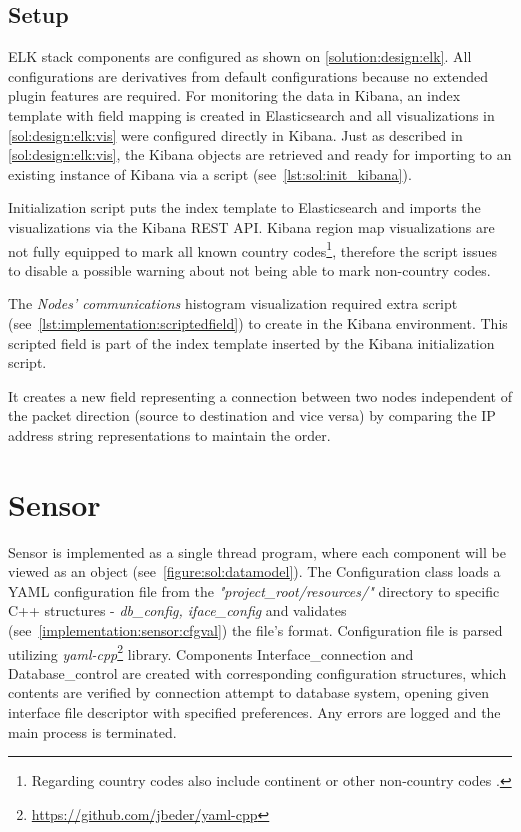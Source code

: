 \documentclass[12pt,a4paper,twoside]{book}
\begin{document}
        \subsection{Setup} \label{implementation:elk:setup}
            ELK stack components are configured as shown on \autoref{solution:design:elk}. All configurations are derivatives from default configurations because no extended plugin features are required. For monitoring the data in Kibana, an index template with field mapping is created in Elasticsearch and all visualizations in \autoref{sol:design:elk:vis} were configured directly in Kibana. Just as described in \autoref{sol:design:elk:vis}, the Kibana objects are retrieved and ready for importing to an existing instance of Kibana via a script (see~\autoref{lst:sol:init_kibana}).
            
            Initialization script puts the index template to Elasticsearch and imports the visualizations via the Kibana REST API. Kibana region map visualizations are not fully equipped to mark all known country codes\footnote{Regarding country codes also include continent or other non-country codes \cite{geoip:country_codes}.}, therefore the script issues to disable a possible warning about not being able to mark non-country codes.\par
            The \emph{Nodes' communications} histogram visualization required extra script (see~\autoref{lst:implementation:scriptedfield}) to create in the Kibana environment. This scripted field is part of the index template inserted by the Kibana initialization script.
            
            It creates a new field representing a connection between two nodes independent of the packet direction (source to destination and vice versa) by comparing the IP address string representations to maintain the order.
    \section{Sensor} \label{implementation:sensor}
        Sensor is implemented as a single thread program, where each component will be viewed as an object (see~\autoref{figure:sol:datamodel}). The Configuration class loads a YAML configuration file from the \emph{"project\_root/resources/"} directory to specific C++ structures - \emph{db\_config, iface\_config} and validates (see~\autoref{implementation:sensor:cfgval}) the file's format. Configuration file is parsed utilizing \emph{yaml-cpp}\footnote{\url{https://github.com/jbeder/yaml-cpp}} library. Components Interface\_connection and Database\_control are created with corresponding configuration structures, which contents are verified by connection attempt to database system, opening given interface file descriptor with specified preferences. Any errors are logged and the main process is terminated.
\end{document}
